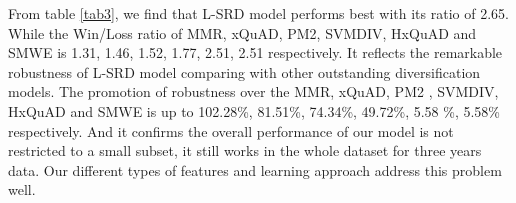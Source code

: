 \documentclass[review]{elsarticle}
\begin{document}



From table \ref{tab3}, we find that L-SRD model performs best with its ratio of 2.65. While the Win/Loss ratio of MMR, xQuAD, PM2, SVMDIV, HxQuAD and SMWE is 1.31, 1.46, 1.52, 1.77, 2.51, 2.51 respectively. It reflects the remarkable robustness of L-SRD model comparing with other outstanding diversification models. The promotion of robustness over the MMR, xQuAD, PM2 , SVMDIV, HxQuAD and SMWE is up to 102.28\%, 81.51\%, 74.34\%, 49.72\%, 5.58 \%, 5.58\% respectively. And it confirms the overall performance of our model is not restricted to a small subset, it still works in the whole dataset for three years data. Our different types of features and learning approach address this problem well.


\iffalse
\end{document}

